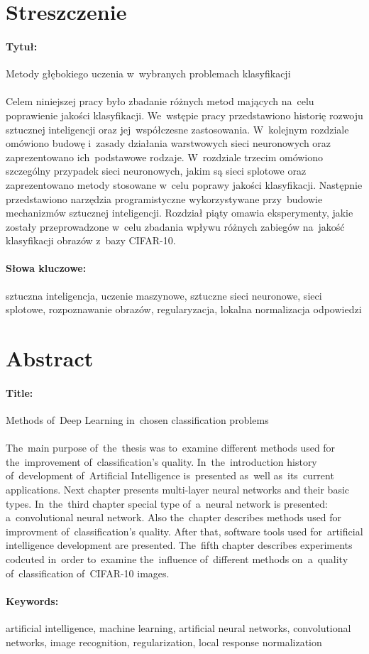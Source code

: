 \newpage
\thispagestyle{empty} %
\section*{Streszczenie}
\paragraph{Tytuł:} Metody głębokiego uczenia w~wybranych problemach klasyfikacji \\\\
Celem niniejszej pracy było zbadanie różnych metod mających na~celu poprawienie jakości klasyfikacji. We~wstępie
pracy przedstawiono historię rozwoju sztucznej inteligencji oraz jej~współczesne zastosowania. W~kolejnym rozdziale
omówiono budowę i~zasady działania warstwowych sieci neuronowych oraz zaprezentowano ich~podstawowe rodzaje.
W~rozdziale trzecim omówiono szczególny przypadek sieci neuronowych, jakim są sieci splotowe oraz zaprezentowano
metody stosowane w~celu poprawy jakości klasyfikacji. Następnie przedstawiono narzędzia programistyczne
wykorzystywane przy~budowie mechanizmów sztucznej inteligencji. Rozdział piąty omawia eksperymenty, jakie zostały
przeprowadzone w~celu zbadania wpływu różnych zabiegów na~jakość klasyfikacji obrazów z~bazy CIFAR-10.

\paragraph{Słowa kluczowe:} sztuczna inteligencja, uczenie maszynowe, sztuczne sieci neuronowe, sieci splotowe,
rozpoznawanie obrazów, regularyzacja, lokalna normalizacja odpowiedzi

\newpage
\thispagestyle{empty} %
\section*{Abstract}
\paragraph{Title:} Methods of~Deep Learning in~chosen classification problems \\\\
The~main purpose of~the~thesis was to~examine different methods used for the~improvement of~classification's quality.
In~the~introduction history of~development of~Artificial Intelligence is~presented as~well as~its~current applications.
Next chapter presents multi-layer neural networks and their basic types. In~the~third chapter special type of~a~neural
network is presented: a~convolutional neural network. Also the~chapter describes methods used for improvment
of~classification's quality. After that, software tools used for~artificial intelligence development are presented.
The~fifth chapter describes experiments codcuted in~order to~examine the~influence of~different methods on~a~quality
of~classification of~CIFAR-10 images.

\paragraph{Keywords:} artificial intelligence, machine learning, artificial neural networks, convolutional networks,
image recognition, regularization, local response normalization